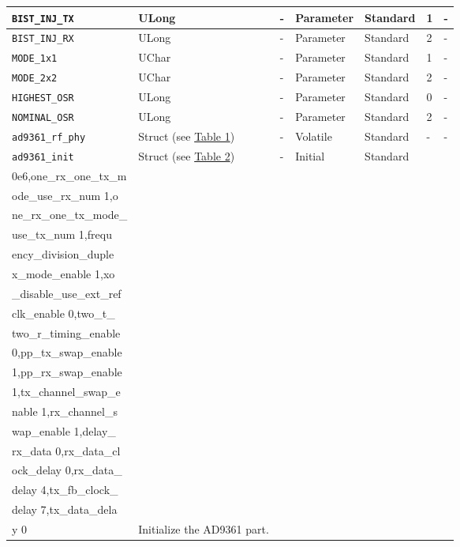 \documentclass{article}
\begin{document}
\begin{landscape}
\begin{scriptsize}
\begin{longtable}{|p{3.6cm}|p{8.1cm}|p{1.4cm}|p{1.3cm}|p{1.4cm}|p{2.5cm}|p{3.6cm}|}
			\hline
      \verb+BIST_INJ_TX+               & ULong        & -               & Parameter             & Standard                         & 1                   & - \\
			\hline
      \verb+BIST_INJ_RX+               & ULong        & -               & Parameter             & Standard                         & 2                   & - \\
			\hline
      \verb+MODE_1x1+                  & UChar        & -               & Parameter             & Standard                         & 1                   & - \\
			\hline
      \verb+MODE_2x2+                  & UChar        & -               & Parameter             & Standard                         & 2                   & - \\
			\hline
      \verb+HIGHEST_OSR+               & ULong        & -               & Parameter             & Standard                         & 0                   & - \\
			\hline
      \verb+NOMINAL_OSR+               & ULong        & -               & Parameter             & Standard                         & 2                   & - \\
			\hline
			\verb+ad9361_rf_phy+ & Struct (see \hyperlink{tab1}{Table 1})  & - & Volatile & Standard & - & - \\
			\hline
			\verb+ad9361_init+ & Struct (see \hyperlink{tab2}{Table 2}) & - & Initial & Standard & \begin{tabular}{l}reference\_clk\_rate 4\\0e6,one\_rx\_one\_tx\_m\\ode\_use\_rx\_num 1,o\\ne\_rx\_one\_tx\_mode\_\\use\_tx\_num 1,frequ\\ency\_division\_duple\\x\_mode\_enable 1,xo\\\_disable\_use\_ext\_ref\\clk\_enable 0,two\_t\_\\two\_r\_timing\_enable\\ 0,pp\_tx\_swap\_enable\\ 1,pp\_rx\_swap\_enable\\ 1,tx\_channel\_swap\_e\\nable 1,rx\_channel\_s\\wap\_enable 1,delay\_\\rx\_data 0,rx\_data\_cl\\ock\_delay 0,rx\_data\_\\delay 4,tx\_fb\_clock\_\\delay 7,tx\_data\_dela\\y 0\end{tabular} & Initialize the AD9361 part. \\

\end{longtable}
\end{scriptsize}
\end{landscape}
\end{document}
